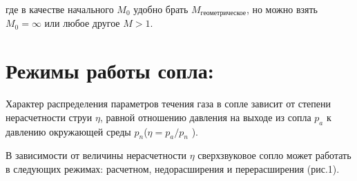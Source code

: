 \documentclass[a4paper]{article}
\begin{document}
где в качестве начального $M_0$ удобно брать $M_\text{геометрическое}$, но можно взять $M_0 = \infty$ или любое другое $M > 1$. 



\section*{Режимы работы сопла:}

Характер распределения параметров течения газа в сопле зависит от степени нерасчетности струи $\eta$, равной отношению давления на выходе из сопла $p_a$ к давлению окружающей среды $p_n$($\eta = p_a / p_n$ ). 
\par
В зависимости от величины нерасчетности $\eta$ сверхзвуковое сопло может работать в следующих режимах: расчетном, недорасширения и перерасширения (рис.1).
\vspace{0.3cm}
\end{document}
